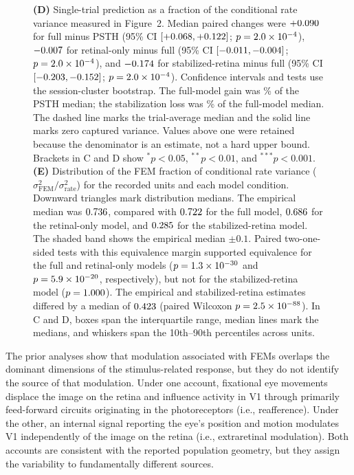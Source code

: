 \documentclass{lite}
\begin{document}
\begin{figure}[t]
{    \textbf{(D)} Single-trial prediction as a fraction of the conditional rate variance measured in Figure~2. Median paired changes were $+0.090$ for full minus PSTH (95\% CI $[+0.068, +0.122]$; $p=2.0\times10^{-4}$), $-0.007$ for retinal-only minus full (95\% CI $[-0.011, -0.004]$; $p=2.0\times10^{-4}$), and $-0.174$ for stabilized-retina minus full (95\% CI $[-0.203, -0.152]$; $p=2.0\times10^{-4}$). Confidence intervals and tests use the session-cluster bootstrap. The full-model gain was \FigThreeDGainPercent\% of the PSTH median; the stabilization loss was \FigThreeDLossPercent\% of the full-model median. The dashed line marks the trial-average median and the solid line marks zero captured variance. Values above one were retained because the denominator is an estimate, not a hard upper bound. Brackets in C and D show $^*p<0.05$, $^{**}p<0.01$, and $^{***}p<0.001$.
    \textbf{(E)} Distribution of the FEM fraction of conditional rate variance ($\sigma^2_{\mathrm{FEM}}/\sigma^2_{\mathrm{rate}}$) for the recorded units and each model condition. Downward triangles mark distribution medians. The empirical median was $0.736$, compared with $0.722$ for the full model, $0.686$ for the retinal-only model, and $0.285$ for the stabilized-retina model. The shaded band shows the empirical median $\pm0.1$. Paired two-one-sided tests with this equivalence margin supported equivalence for the full and retinal-only models ($p=1.3\times10^{-30}$ and $p=5.9\times10^{-20}$, respectively), but not for the stabilized-retina model ($p=1.000$). The empirical and stabilized-retina estimates differed by a median of $0.423$ (paired Wilcoxon $p=2.5\times10^{-88}$). In C and D, boxes span the interquartile range, median lines mark the medians, and whiskers span the 10th--90th percentiles across units.
  }
  \label{fig:model}
\end{figure}


The prior analyses show that modulation associated with FEMs overlaps the dominant dimensions of the stimulus-related response, but they do not identify the source of that modulation. Under one account, fixational eye movements displace the image on the retina and influence activity in V1 through primarily feed-forward circuits originating in the photoreceptors (i.e., reafference). Under the other, an internal signal reporting the eye's position and motion modulates V1 independently of the image on the retina (i.e., extraretinal modulation). Both accounts are consistent with the reported population geometry, but they assign the variability to fundamentally different sources.
\end{document}
